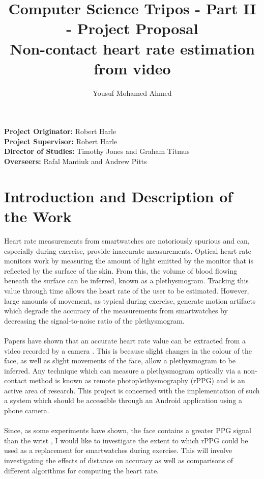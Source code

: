 \documentclass{article}
\title{Computer Science Tripos - Part II - Project Proposal \\
\textbf{Non-contact heart rate estimation from video}}
\author{Yousuf Mohamed-Ahmed \vspace{3ex}}
\begin{document}
\date{\vspace{-5ex}}
\maketitle
 \noindent
 \textbf{Project Originator:} Robert Harle \\
\textbf{Project Supervisor:} Robert Harle \\
\textbf{Director of Studies:} Timothy Jones and Graham Titmus \\
\textbf{Overseers:} Rafal Mantiuk and Andrew Pitts 

\section*{Introduction and Description of the Work}
Heart rate measurements from smartwatches are notoriously spurious and can, especially during exercise, provide inaccurate measurements. Optical heart rate monitors work by measuring the amount of light emitted by the monitor that is reflected by the surface of the skin. From this, the volume of blood flowing beneath the surface can be inferred, known as a plethysmogram. Tracking this value through time allows the heart rate of the user to be estimated. However, large amounts of movement, as typical during exercise, generate motion artifacts which degrade the accuracy of the measurements from smartwatches by decreasing the signal-to-noise ratio of the plethysmogram. \\ \\
Papers have shown that an accurate heart rate value can be extracted from a video recorded by a camera \cite{originalPaper}. This is because slight changes in the colour of the face, as well as slight movements of the face, allow a plethysmogram to be inferred. Any technique which can measure a plethysmogram optically via a non-contact method is known as remote photoplethysmography (rPPG) and is an active area of research. This project is concerned with the implementation of such a system which should be accessible through an Android application using a phone camera. \\ \\
Since, as some experiments have shown, the face contains a greater PPG signal than the wrist \cite{vanderKooij2019}, I would like to investigate the extent to which rPPG could be used as a replacement for smartwatches during exercise. This will involve investigating the effects of distance on accuracy as well as comparisons of different algorithms for computing the heart rate. \\ \\
\end{document}
